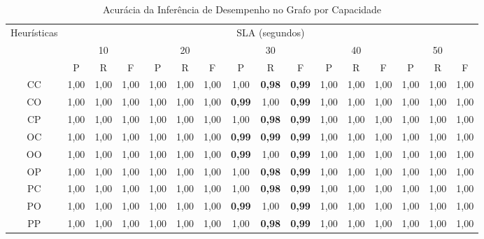 \begin{table}[htbp]
  \centering
    {\fontsize{2.4mm}{1em}\selectfont
    \begin{tabular}{|c|c|c|c|c|c|c|c|c|c|c|c|c|c|c|c|}
    \hline
    \multirow{3}{*}{Heurísticas} & \multicolumn{15}{c|}{SLA (segundos)} \\
    \cline{2-16}
          & \multicolumn{3}{c|}{10} & \multicolumn{3}{c|}{20} & \multicolumn{3}{c|}{30} & \multicolumn{3}{c|}{40} & \multicolumn{3}{c|}{50} \\
          \cline{2-16}
          & P     & R     & F     & P     & R     & F     & P     & R     & F     & P     & R     & F     & P     & R     & F \\
          \hline          
    CC    & 1,00  & 1,00  & 1,00  & 1,00  & 1,00  & 1,00  & 1,00  & \textbf{\color{red}0,98}  & \textbf{\color{red}0,99}  & 1,00  & 1,00  & 1,00  & 1,00  & 1,00  & 1,00 \\
    CO    & 1,00  & 1,00  & 1,00  & 1,00  & 1,00  & 1,00  & \textbf{\color{red}0,99}  & 1,00  & \textbf{\color{red}0,99}  & 1,00  & 1,00  & 1,00  & 1,00  & 1,00  & 1,00 \\
    CP    & 1,00  & 1,00  & 1,00  & 1,00  & 1,00  & 1,00  & 1,00  & \textbf{\color{red}0,98}  & \textbf{\color{red}0,99}  & 1,00  & 1,00  & 1,00  & 1,00  & 1,00  & 1,00 \\
    OC    & 1,00  & 1,00  & 1,00  & 1,00  & 1,00  & 1,00  & \textbf{\color{red}0,99}  & \textbf{\color{red}0,99}  & \textbf{\color{red}0,99}  & 1,00  & 1,00  & 1,00  & 1,00  & 1,00  & 1,00 \\
    OO    & 1,00  & 1,00  & 1,00  & 1,00  & 1,00  & 1,00  & \textbf{\color{red}0,99}  & 1,00  & \textbf{\color{red}0,99}  & 1,00  & 1,00  & 1,00  & 1,00  & 1,00  & 1,00 \\
    OP    & 1,00  & 1,00  & 1,00  & 1,00  & 1,00  & 1,00  & 1,00  & \textbf{\color{red}0,98}  & \textbf{\color{red}0,99}  & 1,00  & 1,00  & 1,00  & 1,00  & 1,00  & 1,00 \\
    PC    & 1,00  & 1,00  & 1,00  & 1,00  & 1,00  & 1,00  & 1,00  & \textbf{\color{red}0,98}  & \textbf{\color{red}0,99}  & 1,00  & 1,00  & 1,00  & 1,00  & 1,00  & 1,00 \\
    PO    & 1,00  & 1,00  & 1,00  & 1,00  & 1,00  & 1,00  & \textbf{\color{red}0,99}  & 1,00  & \textbf{\color{red}0,99}  & 1,00  & 1,00  & 1,00  & 1,00  & 1,00  & 1,00 \\
    PP    & 1,00  & 1,00  & 1,00  & 1,00  & 1,00  & 1,00  & 1,00  & \textbf{\color{red}0,98}  & \textbf{\color{red}0,99}  & 1,00  & 1,00  & 1,00  & 1,00  & 1,00  & 1,00 \\
    \hline
    \end{tabular}%
    }%
  \caption{\label{table:acuracia_capacidade}Acurácia da Inferência de Desempenho no Grafo por Capacidade}
\end{table}%

